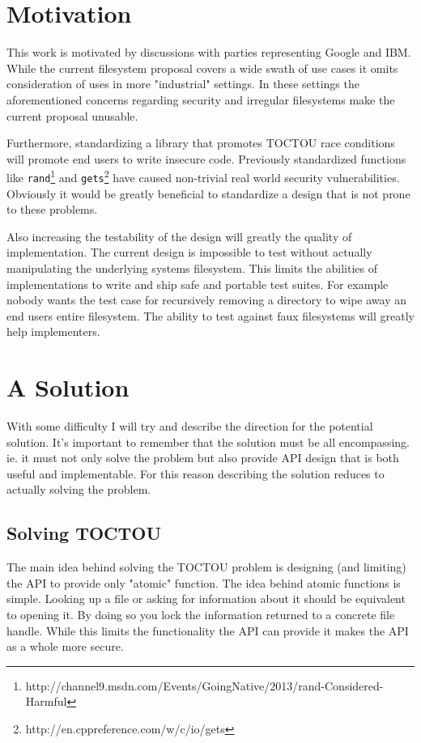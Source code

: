\documentclass{acm_proc_article-sp}
\begin{document}
\section{Motivation}
    This work is motivated by discussions with parties representing Google and
    IBM. While the current filesystem proposal covers a wide swath of use cases
    it omits consideration of uses in more "industrial" settings. In these settings
    the aforementioned concerns regarding security and irregular filesystems
    make the current proposal unusable.

    Furthermore, standardizing a library that promotes TOCTOU race conditions will
    promote end users to write insecure code. Previously standardized
    functions like \verb&rand&\footnote{http://channel9.msdn.com/Events/GoingNative/2013/rand-Considered-Harmful}
    and \verb&gets&\footnote{http://en.cppreference.com/w/c/io/gets}
    have caused non-trivial real world security vulnerabilities. Obviously it 
    would be greatly beneficial to standardize a design that is not prone to
    these problems.

    Also increasing the testability of the design will greatly the quality of
    implementation. The current design is impossible to test without actually
    manipulating the underlying systems filesystem. This limits the abilities of
    implementations to write and ship safe and portable test suites. For example
    nobody wants the test case for recursively removing a directory to wipe away
    an end users entire filesystem. The ability to test against faux filesystems
    will greatly help implementers.

\section{A Solution}
    With some difficulty I will try and describe the direction for the potential
    solution. It's important to remember that the solution must be all
    encompassing. ie. it must not only solve the problem but also provide API
    design that is both useful and implementable. For this reason describing the solution
    reduces to actually solving the problem.

    \subsection {Solving TOCTOU}
    The main idea behind solving the TOCTOU problem is designing (and limiting)
    the API to provide only "atomic" function. The idea behind atomic functions is
    simple. Looking up a file or asking for information about it should be
    equivalent to opening it. By doing so you lock the information returned to
    a concrete file handle. While this limits the functionality the API can
    provide it makes the API as a whole more secure.
\end{document}
